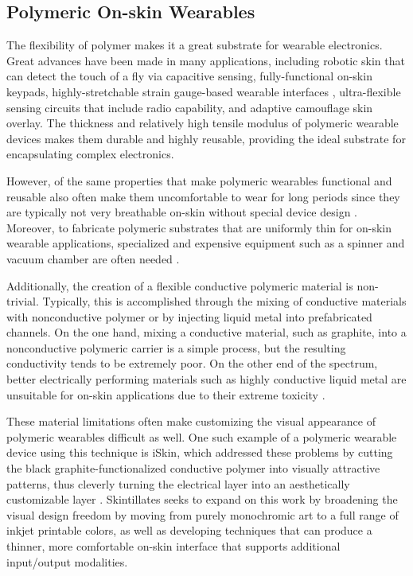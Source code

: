 \documentclass{sigchi}
\begin{document}
\subsection{Polymeric On-skin Wearables}
The flexibility of polymer makes it a great substrate for wearable electronics. Great advances have been made in many applications, including robotic skin that can detect the touch of a fly via capacitive sensing\cite{Mannsfeld:2010is}, fully-functional on-skin keypads\cite{Anonymous:L82kTfjJ}, highly-stretchable strain gauge-based wearable interfaces \cite{Boley:2014dr,Muth:2014bv}, ultra-flexible sensing circuits that include radio capability\cite{Jang:1gb,Anonymous:BBKIC9BZ}, and adaptive camouflage skin overlay\cite{Yu:2014ht}. The thickness and relatively high tensile modulus of polymeric wearable devices makes them durable and highly reusable, providing the ideal substrate for encapsulating complex electronics.

However, of the same properties that make polymeric wearables functional and reusable also often make them uncomfortable to wear for long periods since they are typically not very breathable on-skin without special device design \cite{Jang:1gb}. Moreover, to fabricate polymeric substrates that are uniformly thin for on-skin wearable applications, specialized and expensive equipment such as a spinner and vacuum chamber are often needed \cite{Son:2014iya,Yu:2014ht,Anonymous:BBKIC9BZ,Jang:1gb,Muth:2014bv,Anonymous:L82kTfjJ}. 

Additionally, the creation of a flexible conductive polymeric material is non-trivial.  Typically, this is accomplished through the mixing of conductive materials with nonconductive polymer or by injecting liquid metal into prefabricated channels. On the one hand, mixing a conductive material, such as graphite, into a nonconductive polymeric carrier is a simple process, but the resulting conductivity tends  to  be  extremely poor\cite{Weigel:2015fh,Frutiger:2015fm}. On the other end of the spectrum, better electrically performing materials such as highly conductive liquid  metal  are unsuitable for on-skin applications due to their extreme toxicity \cite{Boley:2014dr}. 

These material limitations often make customizing the visual appearance of polymeric wearables difficult as well. One such example of a polymeric wearable device using this technique is iSkin, which addressed these problems by cutting the black graphite-functionalized conductive polymer into visually attractive patterns, thus cleverly turning the electrical layer into an aesthetically customizable layer \cite{Weigel:2015fh}. Skintillates seeks to expand on this work by broadening the visual design freedom by moving from purely monochromic art to a full range of inkjet printable colors, as well as developing techniques that can produce a thinner, more comfortable on-skin interface that supports additional input/output modalities. 
\end{document}
